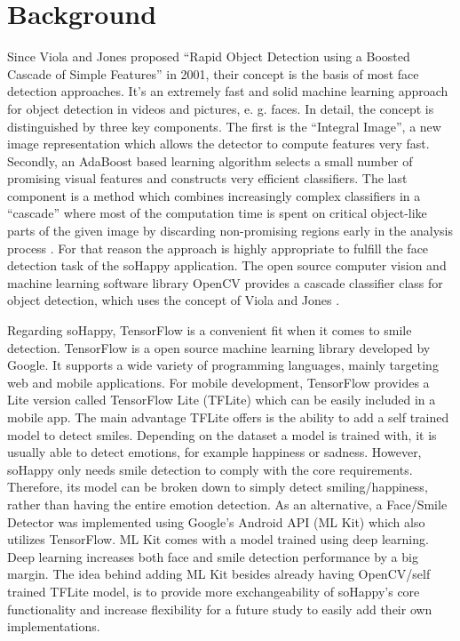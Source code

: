 \section{Background} \label{sec:background}

Since Viola and Jones proposed ``Rapid Object Detection using a Boosted Cascade of Simple Features'' in 2001, their concept is the basis of most face detection approaches.
It's an extremely fast and solid machine learning approach for object detection in videos and pictures, e. g. faces.
In detail, the concept is distinguished by three key components.
The first is the ``Integral Image'', a new image representation which allows the detector to compute features very fast.
Secondly, an AdaBoost based learning algorithm selects a small number of promising visual features and constructs very efficient classifiers.
The last component is a method which combines increasingly complex classifiers in a ``cascade'' where most of the computation time is spent on critical object-like parts of the given image by discarding non-promising regions early in the analysis process \cite{viola_jones}.
For that reason the approach is highly appropriate to fulfill the face detection task of the soHappy application.
The open source computer vision and machine learning software library OpenCV provides a cascade classifier class for object detection, which uses the concept of Viola and Jones \cite{opencv_cascade_classifier}.

Regarding soHappy, TensorFlow \cite{tensorflow} is a convenient fit when it comes to smile detection.
TensorFlow is a open source machine learning library developed by Google.
It supports a wide variety of programming languages, mainly targeting web and mobile applications.
For mobile development, TensorFlow provides a Lite version called TensorFlow Lite (TFLite) which can be easily included in a mobile app.
The main advantage TFLite offers is the ability to add a self trained model to detect smiles.
Depending on the dataset a model is trained with, it is usually able to detect emotions, for example happiness or sadness.
However, soHappy only needs smile detection to comply with the core requirements.
Therefore, its model can be broken down to simply detect smiling/happiness, rather than having the entire emotion detection.
As an alternative, a Face/Smile Detector was implemented using Google's Android API (ML Kit) \cite{mlkit} which also utilizes TensorFlow.
ML Kit comes with a model trained using deep learning.
Deep learning increases both face and smile detection performance by a big margin.
The idea behind adding ML Kit besides already having OpenCV/self trained TFLite model, is to provide more exchangeability of soHappy's core functionality and increase flexibility for a future study to easily add their own implementations.
